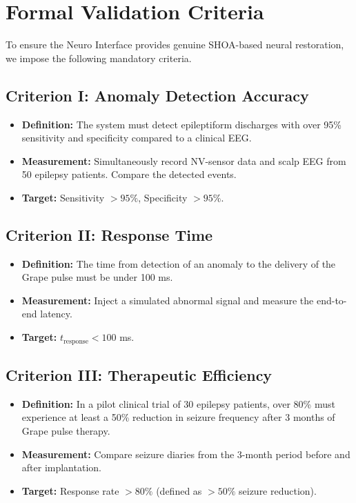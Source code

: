 \documentclass[12pt]{article}
\begin{document}
\section{Formal Validation Criteria}
To ensure the Neuro Interface provides genuine SHOA-based neural restoration, we impose the following mandatory criteria.

\subsection{Criterion I: Anomaly Detection Accuracy}
\begin{itemize}
    \item \textbf{Definition:} The system must detect epileptiform discharges with over 95\% sensitivity and specificity compared to a clinical EEG.
    \item \textbf{Measurement:} Simultaneously record NV-sensor data and scalp EEG from 50 epilepsy patients. Compare the detected events.
    \item \textbf{Target:} Sensitivity $> 95\%$, Specificity $> 95\%$.
\end{itemize}

\subsection{Criterion II: Response Time}
\begin{itemize}
    \item \textbf{Definition:} The time from detection of an anomaly to the delivery of the Grape pulse must be under 100 ms.
    \item \textbf{Measurement:} Inject a simulated abnormal signal and measure the end-to-end latency.
    \item \textbf{Target:} $t_{\text{response}} < 100$ ms.
\end{itemize}

\subsection{Criterion III: Therapeutic Efficiency}
\begin{itemize}
    \item \textbf{Definition:} In a pilot clinical trial of 30 epilepsy patients, over 80\% must experience at least a 50\% reduction in seizure frequency after 3 months of Grape pulse therapy.
    \item \textbf{Measurement:} Compare seizure diaries from the 3-month period before and after implantation.
    \item \textbf{Target:} Response rate $> 80\%$ (defined as $> 50\%$ seizure reduction).
\end{itemize}
\end{document}
